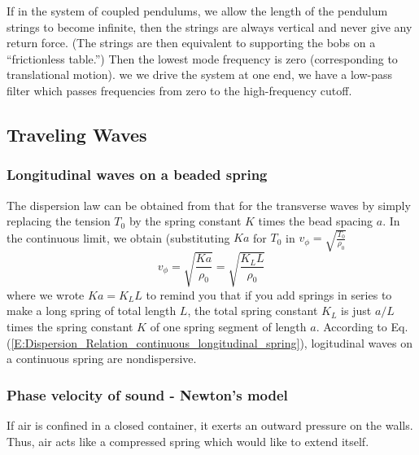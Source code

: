 \documentclass[twoside, 10pt]{amsart}
\begin{document}
If in the system of coupled pendulums, we allow the length of the pendulum strings to become infinite, then the strings are always vertical and never give any return force.  (The strings are then equivalent to supporting the bobs on a ``frictionless table.'')  Then the lowest mode frequency is zero (corresponding to translational motion).  we we drive the system at one end, we have a low-pass filter which passes frequencies from zero to the high-frequency cutoff.  

\subsection{ Traveling Waves } 
\subsubsection*{ Longitudinal waves on a beaded spring } The dispersion law can be obtained from that for the transverse waves by simply replacing the tension $T_0$ by the spring constant $K$ times the bead spacing $a$.  In the continuous limit, we obtain (substituting $Ka$ for $T_0$ in $v_{\phi} = \sqrt{ \frac{T_0}{\rho_0} }$ 
\begin{equation}\label{E:Dispersion_Relation_continuous_longitudinal_spring}
  v_{\phi} = \sqrt{ \frac{Ka}{\rho_0} }  = \sqrt{ \frac{ K_L L}{\rho_0} }
\end{equation}
where we wrote $Ka = K_L L$ to remind you that if you add springs in series to make a long spring of total length $L$, the total spring constant $K_L$ is just $a/L$ times the spring constant $K$ of one spring segment of length $a$.  According to Eq. (\ref{E:Dispersion_Relation_continuous_longitudinal_spring}), logitudinal waves on a continuous spring are nondispersive.  \subsubsection*{ Phase velocity of sound - Newton's model }
If air is confined in a closed container, it exerts an outward pressure on the walls.  \medskip \\
\phantom{ If ai} Thus, air acts like a compressed spring which would like to extend itself.  
\end{document}
